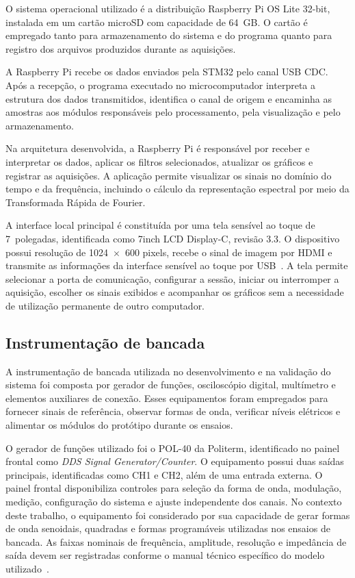\documentclass[a4paper,12pt]{fcte}
\begin{document}
O sistema operacional utilizado é a distribuição Raspberry Pi OS Lite 32-bit, instalada em um cartão microSD com capacidade de 64~GB. O cartão é empregado tanto para armazenamento do sistema e do programa quanto para registro dos arquivos produzidos durante as aquisições.

A Raspberry Pi recebe os dados enviados pela STM32 pelo canal USB CDC. Após a recepção, o programa executado no microcomputador interpreta a estrutura dos dados transmitidos, identifica o canal de origem e encaminha as amostras aos módulos responsáveis pelo processamento, pela visualização e pelo armazenamento.

Na arquitetura desenvolvida, a Raspberry Pi é responsável por receber e interpretar os dados, aplicar os filtros selecionados, atualizar os gráficos e registrar as aquisições. A aplicação permite visualizar os sinais no domínio do tempo e da frequência, incluindo o cálculo da representação espectral por meio da Transformada Rápida de Fourier.

A interface local principal é constituída por uma tela sensível ao toque de 7~polegadas, identificada como 7inch LCD Display-C, revisão 3.3. O dispositivo possui resolução de 1024~$\times$~600 pixels, recebe o sinal de imagem por HDMI e transmite as informações da interface sensível ao toque por USB~\cite{waveshare_7inch_lcd_c}. A tela permite selecionar a porta de comunicação, configurar a sessão, iniciar ou interromper a aquisição, escolher os sinais exibidos e acompanhar os gráficos sem a necessidade de utilização permanente de outro computador.


\subsection{Instrumentação de bancada}
\label{subsec:instrumentacao_bancada}

A instrumentação de bancada utilizada no desenvolvimento e na validação do sistema foi composta por gerador de funções, osciloscópio digital, multímetro e elementos auxiliares de conexão. Esses equipamentos foram empregados para fornecer sinais de referência, observar formas de onda, verificar níveis elétricos e alimentar os módulos do protótipo durante os ensaios.

O gerador de funções utilizado foi o POL-40 da Politerm, identificado no painel frontal como \textit{DDS Signal Generator/Counter}. O equipamento possui duas saídas principais, identificadas como CH1 e CH2, além de uma entrada externa. O painel frontal disponibiliza controles para seleção da forma de onda, modulação, medição, configuração do sistema e ajuste independente dos canais. No contexto deste trabalho, o equipamento foi considerado por sua capacidade de gerar formas de onda senoidais, quadradas e formas programáveis utilizadas nos ensaios de bancada. As faixas nominais de frequência, amplitude, resolução e impedância de saída devem ser registradas conforme o manual técnico específico do modelo utilizado~\cite{politerm_pol40_manual}.
\end{document}
